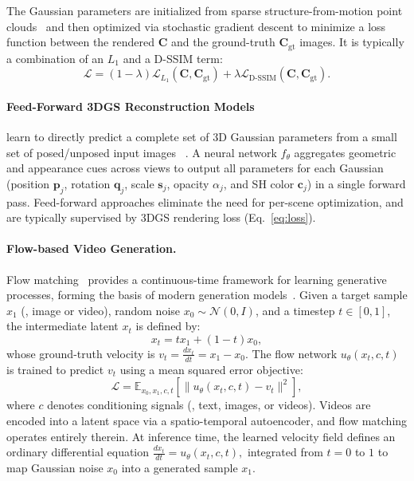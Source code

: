 The Gaussian parameters are initialized from sparse structure-from-motion point clouds~\cite{schoenberger2016colmap} and then optimized via stochastic gradient descent to minimize a loss function between the rendered $\mathbf{C}$ and the ground-truth $\mathbf{C}_{\text{gt}}$ images. It is typically a combination of an $L_1$ and a D-SSIM term:
\begin{equation}
    \mathcal{L} = (1 - \lambda) \mathcal{L}_{L_1}(\mathbf{C}, \mathbf{C}_{\text{gt}}) + \lambda \mathcal{L}_{\text{D-SSIM}}(\mathbf{C}, \mathbf{C}_{\text{gt}}).
    \label{eq:loss}
\end{equation}

\paragraph{Feed-Forward 3DGS Reconstruction Models} learn to directly predict a complete set of 3D Gaussian parameters from a small set of posed/unposed input images 
~\cite{zhang2024gslrm,ye2024no,charatan2024pixelsplat,xu2024depthsplat}. A neural network $f_\theta$ aggregates geometric and appearance cues across views to output all parameters for each Gaussian (position $\mathbf{p}_j$, rotation $\mathbf{q}_j$, scale $\mathbf{s}_j$, opacity $\alpha_j$, and SH color $\mathbf{c}_j$) in a single forward pass. Feed-forward approaches eliminate the need for per-scene optimization, and are typically supervised by 3DGS rendering loss (Eq.~\ref{eq:loss}).

\paragraph{Flow-based Video Generation.}
Flow matching~\cite{liu2022flow} provides a continuous-time framework for learning generative processes, forming the basis of modern generation models~\cite{wan2025,esser2024scaling}. 
Given a target sample $x_1$ (\eg, image or video), random noise $x_0 \sim \mathcal{N}(0,I)$, and a timestep $t \in [0,1]$, the intermediate latent $x_t$ is defined by:
\begin{equation}
    x_t = t x_1 + (1-t)x_0,
\end{equation}
whose ground-truth velocity is
$
    v_t = \frac{dx_t}{dt} = x_1 - x_0.
$
The flow network $u_\theta(x_t, c, t)$ is trained to predict $v_t$ using a mean squared error objective:
\begin{equation}
    \mathcal{L} = \mathbb{E}_{x_0, x_1, c, t} \left[\|u_\theta(x_t, c, t) - v_t\|^2\right],
\label{eq:fm}
\end{equation}
where $c$ denotes conditioning signals (\eg, text, images, or videos). 
Videos are encoded into a latent space via a spatio-temporal autoencoder, and flow matching operates entirely therein. At inference time, the learned velocity field defines an ordinary differential equation
    $\frac{dx_t}{dt} = u_\theta(x_t, c, t),$
integrated from $t{=}0$ to $1$ to map Gaussian noise $x_0$ into a generated sample $x_1$.

